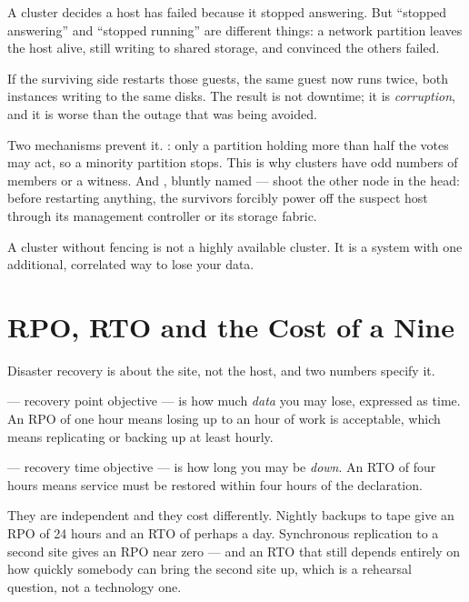 \begin{alertbox}
A cluster decides a host has failed because it stopped answering. But
``stopped answering'' and ``stopped running'' are different things: a network
partition leaves the host alive, still writing to shared storage, and
convinced the others failed.

\smallskip
If the surviving side restarts those guests, the same guest now runs twice,
both instances writing to the same disks. The result is not downtime; it is
\emph{corruption}, and it is worse than the outage that was being avoided.

\smallskip
Two mechanisms prevent it. : only a partition holding more than
half the votes may act, so a minority partition stops. This is why clusters
have odd numbers of members or a witness. And , bluntly named
 --- shoot the other node in the head: before restarting
anything, the survivors forcibly power off the suspect host through its
management controller or its storage fabric.

\smallskip
A cluster without fencing is not a highly available cluster. It is a system
with one additional, correlated way to lose your data.
\end{alertbox}

\section{RPO, RTO and the Cost of a Nine}

Disaster recovery is about the site, not the host, and two numbers specify it.

\begin{definitionbox}
 --- recovery point objective --- is how much \emph{data} you may
lose, expressed as time. An RPO of one hour means losing up to an hour of work
is acceptable, which means replicating or backing up at least hourly.

\smallskip
{} --- recovery time objective --- is how long you may be \emph{down}.
An RTO of four hours means service must be restored within four hours of the
declaration.

\smallskip
They are independent and they cost differently. Nightly backups to tape give an
RPO of 24 hours and an RTO of perhaps a day. Synchronous replication to a
second site gives an RPO near zero --- and an RTO that still depends entirely on
how quickly somebody can bring the second site up, which is a rehearsal
question, not a technology one.
\end{definitionbox}

